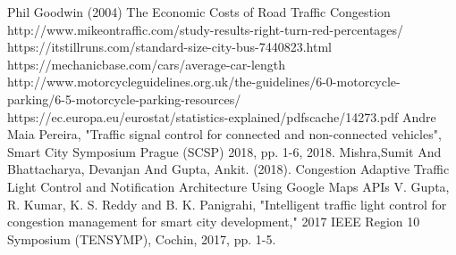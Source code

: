 \documentclass[conference]{IEEEtran}
\begin{document}
\begin{thebibliography}{00}
 Phil Goodwin (2004) The Economic Costs of Road Traffic Congestion 
 http://www.mikeontraffic.com/study-results-right-turn-red-percentages/
 https://itstillruns.com/standard-size-city-bus-7440823.html
 https://mechanicbase.com/cars/average-car-length
 http://www.motorcycleguidelines.org.uk/the-guidelines/6-0-motorcycle-parking/6-5-motorcycle-parking-resources/
 https://ec.europa.eu/eurostat/statistics-explained/pdfscache/14273.pdf
 Andre Maia Pereira, "Traffic signal control for connected and non-connected vehicles", Smart City Symposium Prague (SCSP) 2018, pp. 1-6, 2018.
 Mishra,Sumit And Bhattacharya, Devanjan And Gupta, Ankit. (2018). Congestion Adaptive Traffic Light Control and Notification Architecture Using Google Maps APIs
 V. Gupta, R. Kumar, K. S. Reddy and B. K. Panigrahi, "Intelligent traffic light control for congestion management for smart city development," 2017 IEEE Region 10 Symposium (TENSYMP), Cochin, 2017, pp. 1-5.


\end{thebibliography}
\end{document}
